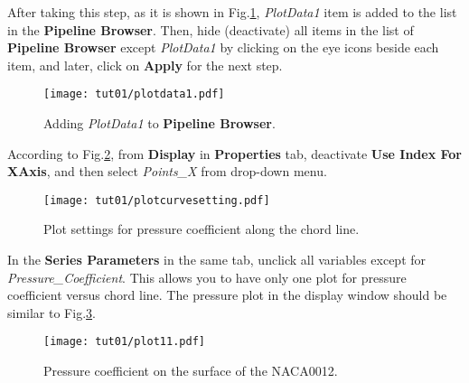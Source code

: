 After taking this step, as it is shown in Fig.\ref{fig1:plotdata-list}, \textit{PlotData1} item is added to the list in the \textbf{Pipeline Browser}. Then, hide (deactivate) all items in the list of \textbf{Pipeline Browser} except \textit{PlotData1} by clicking on the eye icons beside each item, and later, click on \textbf{Apply} for the next step.
\begin{figure}[htbp]
    \centering
    \texttt{[image: tut01/plotdata1.pdf]}
    \caption{Adding \textit{PlotData1} to \textbf{Pipeline Browser}.}
    \label{fig1:plotdata-list}
\end{figure}
According to Fig.\ref{fig1:pointsx}, from \textbf{Display} in \textbf{Properties} tab, deactivate \textbf{Use Index For XAxis}, and then select \textit{Points\_X} from drop-down menu. 
\begin{figure}[htbp]
    \centering
    \texttt{[image: tut01/plotcurvesetting.pdf]}
    \caption{Plot settings for pressure coefficient along the chord line.}
    \label{fig1:pointsx}
\end{figure}
In the \textbf{Series Parameters} in the same tab, unclick all variables except for \textit{Pressure\_Coefficient}. This allows you to have only one plot for pressure coefficient versus chord line. The pressure plot in the display window should be similar to Fig.\ref{fig1:surface_pressure}.
\begin{figure}[htbp]
    \centering
    \texttt{[image: tut01/plot11.pdf]}
    \caption{Pressure coefficient on the surface of the NACA0012.}
    \label{fig1:surface_pressure}
\end{figure}

